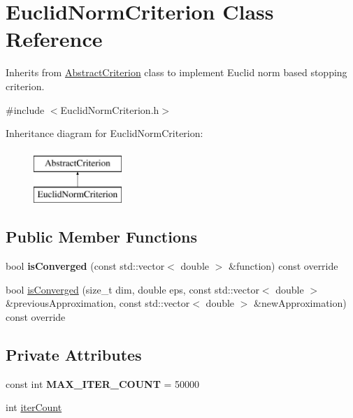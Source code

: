 \hypertarget{class_euclid_norm_criterion}{}\section{Euclid\+Norm\+Criterion Class Reference}
\label{class_euclid_norm_criterion}


Inherits from \hyperlink{class_abstract_criterion}{Abstract\+Criterion} class to implement Euclid norm based stopping criterion.  




{\ttfamily \#include $<$Euclid\+Norm\+Criterion.\+h$>$}

Inheritance diagram for Euclid\+Norm\+Criterion\+:\begin{figure}[H]
\begin{center}
\leavevmode
\includegraphics[height=2.000000cm]{class_euclid_norm_criterion}
\end{center}
\end{figure}
\subsection*{Public Member Functions}
\begin{DoxyCompactItemize}
\item 
\mbox{\label{class_euclid_norm_criterion_a07b3db6194bf73995c0ca0ec17588b14}} 
bool {\bfseries is\+Converged} (const std\+::vector$<$ double $>$ \&function) const override
\item 
bool \hyperlink{class_euclid_norm_criterion_a210c1396bb5ba2fab199f64eea3a8f76}{is\+Converged} (size\+\_\+t dim, double eps, const std\+::vector$<$ double $>$ \&previous\+Approximation, const std\+::vector$<$ double $>$ \&new\+Approximation) const override
\end{DoxyCompactItemize}
\subsection*{Private Attributes}
\begin{DoxyCompactItemize}
\item 
\mbox{\label{class_euclid_norm_criterion_a9148ec33b8025fd5b656cc8222a228f7}} 
const int {\bfseries M\+A\+X\+\_\+\+I\+T\+E\+R\+\_\+\+C\+O\+U\+NT} = 50000
\item 
int \hyperlink{class_euclid_norm_criterion_afbace03a4e9df12244904b3bdcf7a9e2}{iter\+Count}
\end{DoxyCompactItemize}


